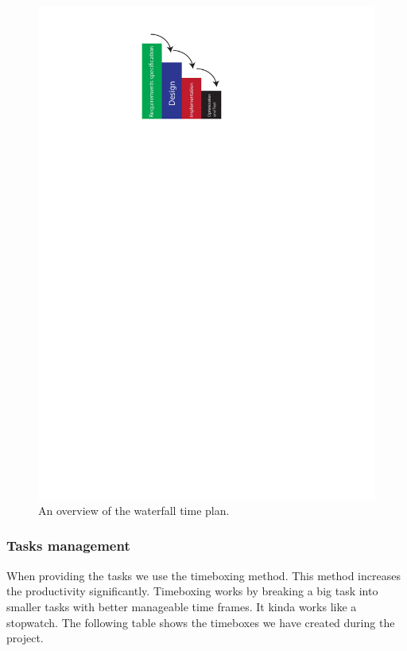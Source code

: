 \begin{figure}[h]
  \centering
  \includegraphics[scale=0.6]{Figures/Waterfall}
  \caption{An overview of the waterfall time plan.}
\label{fig:Waterfall}
\end{figure}


\subsubsection{Tasks management}%
When providing the tasks we use the timeboxing method.
This method increases the productivity significantly.
Timeboxing works by breaking a big task into smaller tasks with better manageable time frames.
It kinda works like a stopwatch. The following table shows the timeboxes we have
created during the project.


